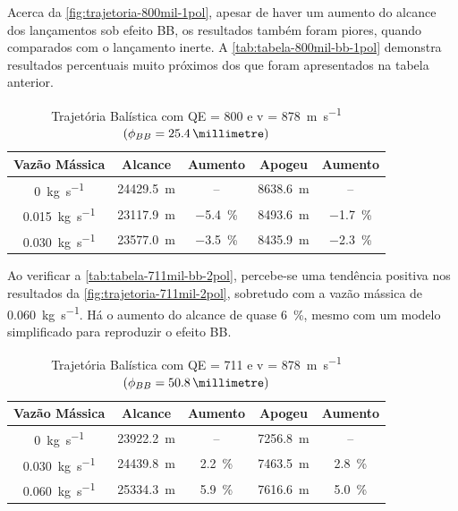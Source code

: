 Acerca da \autoref{fig:trajetoria-800mil-1pol}, apesar de haver um aumento do alcance dos lançamentos sob efeito BB, os resultados também foram piores, quando comparados com o lançamento inerte. A \autoref{tab:tabela-800mil-bb-1pol} demonstra resultados percentuais muito próximos dos que foram apresentados na tabela anterior.

\begin{table}[ht]
\centering
\caption[Trajetória Balística com QE = \qty{800}{\milliradian} e v = \qty{878}{\metre\per\second} \(\left(\phi_{BB} = \qty{25,4}{\millimetre}\right)\)]{Trajetória Balística com QE = \qty{800}{\milliradian} e v = \qty{878}{\metre\per\second} \(\left(\phi_{BB} = \qty{25,4}{\millimetre}\right)\)}
\vspace{0.5cm}
\begin{tabular}{c|c|c|c|c}
Vazão Mássica & Alcance & Aumento & Apogeu & Aumento \\
\hline
\qty{0}{\kilogram\per\second} & \qty{24429,5}{\metre} & -- & \qty{8638,6}{\metre} & -- \\ 
\qty{0,015}{\kilogram\per\second} & \qty{23117,9}{\metre} & \qty{-5,4}{\percent} & \qty{8493,6}{\metre} & \qty{-1,7}{\percent} \\
\qty{0,030}{\kilogram\per\second} & \qty{23577,0}{\metre} & \qty{-3,5}{\percent} & \qty{8435,9}{\metre} & \qty{-2,3}{\percent}
\end{tabular}
\label{tab:tabela-800mil-bb-1pol}
\end{table}

Ao verificar a \autoref{tab:tabela-711mil-bb-2pol}, percebe-se uma tendência positiva nos resultados da \autoref{fig:trajetoria-711mil-2pol}, sobretudo com a vazão mássica de \qty{0,060}{\kilogram\per\second}. Há o aumento do alcance de quase \qty{6}{\percent}, mesmo com um modelo simplificado para reproduzir o efeito BB.

\begin{table}[ht]
\centering
\caption[Trajetória Balística com QE = \qty{711}{\milliradian} e v = \qty{878}{\metre\per\second} \(\left(\phi_{BB} = \qty{50,8}{\millimetre}\right)\)]{Trajetória Balística com QE = \qty{711}{\milliradian} e v = \qty{878}{\metre\per\second} \(\left(\phi_{BB} = \qty{50,8}{\millimetre}\right)\)}
\vspace{0.5cm}
\begin{tabular}{c|c|c|c|c}
Vazão Mássica & Alcance & Aumento & Apogeu & Aumento \\
\hline
\qty{0}{\kilogram\per\second} & \qty{23922,2}{\metre} & -- & \qty{7256,8}{\metre} & -- \\
\qty{0,030}{\kilogram\per\second} & \qty{24439,8}{\metre} & \qty{2,2}{\percent} & \qty{7463,5}{\metre} & \qty{2,8}{\percent} \\
\qty{0,060}{\kilogram\per\second} & \qty{25334,3}{\metre} & \qty{5,9}{\percent} & \qty{7616,6}{\metre} & \qty{5,0}{\percent}
\end{tabular}
\label{tab:tabela-711mil-bb-2pol}
\end{table}

